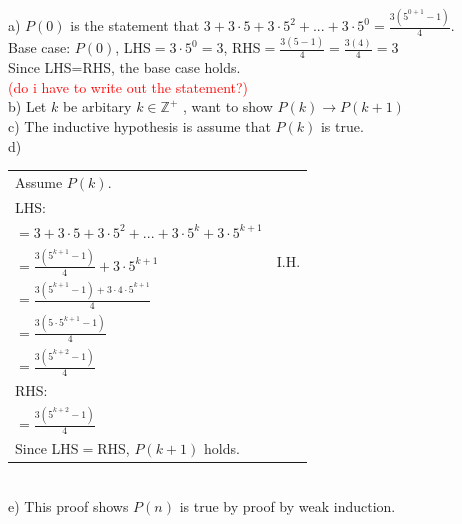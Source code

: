 \documentclass[12pt]{exam}
\begin{document}
\begin{solution}
	a) $P(0)$ is the statement that $3 + 3 \cdot 5 + 3 \cdot 5^2 + ... + 3 \cdot 5^0 = \frac{3 (5^{0+1} - 1)}{4}$.\\
	Base case: $P(0)$, LHS$=3 \cdot 5^0=3$, RHS$=\frac{3(5-1)}{4}=\frac{3(4)}{4}=3$\\
	Since LHS=RHS, the base case holds.\\
	\textcolor{red}{ (do i have to write out the statement?)
	}\\ b) Let $k$ be arbitary $ k \in \mathbb{Z}^+$ , want to show $P(k) \rightarrow P(k+1)$\\
	c) The inductive hypothesis is assume that $P(k)$ is true.\\
	d)\\
	\begin{tabular}{ll}
		Assume $P(k)$.                                                       \\
		LHS:                                                                 \\
		$=3 + 3 \cdot 5 + 3 \cdot 5^2 + ... +3 \cdot 5^{k}+ 3 \cdot 5^{k+1}$ \\
		$=\frac{3 (5^{k+1} - 1)}{4}+3 \cdot 5^{k+1}$ & I.H.                  \\
		$=\frac{3(5^{k+1}-1)+ 3 \cdot 4 \cdot 5^{k+1}}{4}$                   \\
		$=\frac{3(5\cdot 5^{k+1}-1)}{4}$                                     \\
		$=\frac{3(5^{k+2}-1)}{4}$                                            \\
		RHS:                                                                 \\
		$=\frac{3(5^{k+2}-1)}{4}$                                            \\
		Since LHS$=$RHS, $P(k+1)$ holds.
	\end{tabular}
	\\e) This proof shows $P(n)$ is true by proof by weak induction.
\end{solution}
\end{document}
